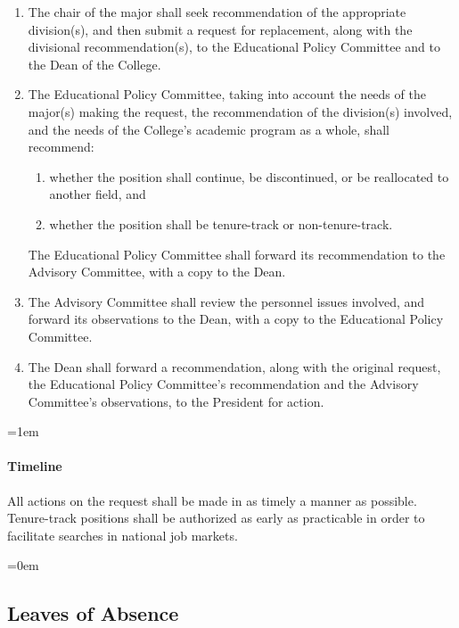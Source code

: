\documentclass{manual}
\let\oldsubsection\subsection
\renewcommand\subsection{\leftskip=0em\oldsubsection}
\let\oldparagraph\paragraph
\renewcommand\paragraph{\leftskip=1em\oldparagraph}
\newcommand{\itemLevelA}{\alph*.}
\newcommand{\itemLevelB}{\arabic*)}
\newcommand{\itemRefA}{\alph*}
\newcommand{\itemRefB}{\arabic*}
\begin{document}
\begin{enumerate}[label=\itemLevelA,ref=\itemRefA]
\item  The chair of the major shall seek recommendation of the appropriate division(s), and then submit a request for replacement, along with the divisional recommendation(s), to the Educational Policy Committee and to the Dean of the College.

\item  The Educational Policy Committee, taking into account the needs of the major(s) making the request, the recommendation of the division(s) involved, and the needs of the College's academic program as a whole, shall recommend:
\begin{enumerate}[label=\itemLevelB,ref=\itemRefB]

\item whether the position shall continue, be discontinued, or be reallocated to another field, and

\item whether the position shall be tenure-track or non-tenure-track.
\end{enumerate}
The Educational Policy Committee shall forward its recommendation to the Advisory Committee, with a copy to the Dean.

\item The Advisory Committee shall review the personnel issues involved, and forward its observations to the Dean, with a copy to the Educational Policy Committee.

\item The Dean shall forward a recommendation, along with the original request, the Educational Policy Committee's recommendation and the Advisory Committee's observations, to the President for action.
\end{enumerate}

\paragraph{Timeline} 
All actions on the request shall be made in as timely a manner as possible. Tenure-track positions shall be authorized as early as practicable in order to facilitate searches in national job markets.

\subsection{Leaves of Absence}\label{sec:LeavesOfAbsence}
\end{document}
